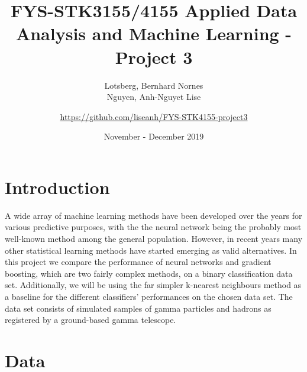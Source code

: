 \documentclass[a4paper, 11pt, twocolumn]{article}
\title{FYS-STK3155/4155 Applied Data Analysis and Machine Learning - Project 3 }
\author{Lotsberg, Bernhard Nornes \\ Nguyen, Anh-Nguyet Lise \and
\url{https://github.com/liseanh/FYS-STK4155-project3}}
\date{November - December 2019}
\begin{document}


\section{Introduction}
A wide array of machine learning methods have been developed over the years for 
various predictive purposes, with the the neural network being the probably most 
well-known method among the general population. However, in recent years many 
other statistical learning methods have started emerging as valid alternatives. 
In this project we compare the performance of neural networks and gradient 
boosting, which are two fairly complex methods, on a binary classification data 
set. Additionally, we will be using the far simpler k-nearest neighbours method 
as a baseline for the different classifiers' performances on the chosen 
data set. The data set consists of simulated samples of gamma particles and 
hadrons as registered by a ground-based gamma telescope. 


\section{Data}
\end{document}
